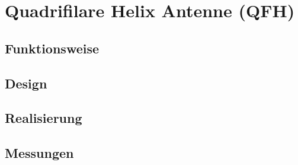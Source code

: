 \chapter{Quadrifilare Helix Antenne (QFH)}

\section{Funktionsweise}

\section{Design}

\section{Realisierung}

\section{Messungen}
